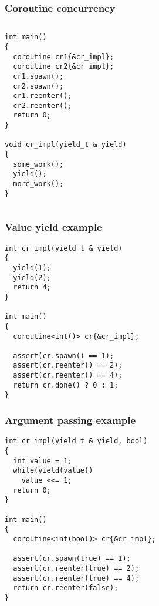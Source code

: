 \documentclass{beamer}
\begin{document}
\begin{frame}[fragile]
\frametitle{Coroutine concurrency}
\begin{columns}
\begin{column}{0.65\textwidth}
\begin{block}{}

\begin{lstlisting}[basicstyle=\small]
int main()
{
  coroutine cr1{&cr_impl};
  coroutine cr2{&cr_impl};
  cr1.spawn();
  cr2.spawn();
  cr1.reenter();
  cr2.reenter();
  return 0;
}

void cr_impl(yield_t & yield)
{
  some_work();
  yield();
  more_work();
}
\end{lstlisting}
\end{block}
\end{column}
\begin{column}{0.35\textwidth}
\begin{adjustbox}{max totalsize={.95\textwidth}{.85\textheight},center}

\end{adjustbox}
\end{column}
\end{columns}
\end{frame}


\begin{frame}[fragile]
\frametitle{Value yield example}

\begin{block}{}
\begin{lstlisting}[basicstyle=\small]
int cr_impl(yield_t & yield) 
{
  yield(1);
  yield(2);
  return 4;  
}

int main() 
{
  coroutine<int()> cr{&cr_impl};
  
  assert(cr.spawn() == 1);
  assert(cr.reenter() == 2);
  assert(cr.reenter() == 4);
  return cr.done() ? 0 : 1;
}
\end{lstlisting}

\end{block}
\end{frame}

\begin{frame}[fragile]
\frametitle{Argument passing example}
\begin{block}{}
\begin{lstlisting}[basicstyle=\small]
int cr_impl(yield_t & yield, bool) 
{
  int value = 1;
  while(yield(value))
    value <<= 1;
  return 0;
}

int main() 
{
  coroutine<int(bool)> cr{&cr_impl};
  
  assert(cr.spawn(true) == 1);
  assert(cr.reenter(true) == 2);
  assert(cr.reenter(true) == 4);
  return cr.reenter(false);
}
\end{lstlisting}
\end{block}
\end{frame}
\end{document}
